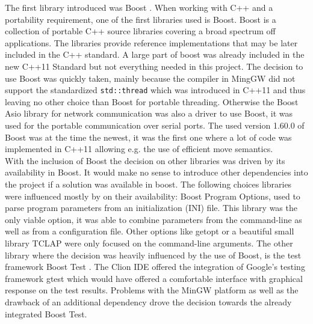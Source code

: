 The first library introduced was Boost \cite{boost}. When working with C++ and a portability requirement, one of the first libraries used is Boost. Boost is a collection of portable C++ source libraries covering a broad spectrum off applications. The libraries provide reference implementations that may be later included in the C++ standard. A large part of boost was already included in the new C++11 Standard \cite{cpp_11} but not everything needed in this project. The decision to use Boost was quickly taken, mainly because the compiler in MingGW \cite{mingw} did not support the standardized \texttt{std::thread} which was introduced in C++11 and thus leaving no other choice than Boost for portable threading. Otherwise the Boost Asio library \cite{boost_asio} for network communication was also a driver to use Boost, it was used for the portable communication over serial ports. The used version 1.60.0 of Boost was at the time the newest, it was the first one where a lot of code was implemented in C++11 allowing e.g. the use of efficient move semantics.\\
With the inclusion of Boost the decision on other libraries was driven by its availability in Boost. It would make no sense to introduce other dependencies into the project if a solution was available in boost. The following choices libraries were influenced mostly by on their availability: Boost Program Options, used to parse program parameters from an initialization (INI) file. This library was the only viable option, it was able to combine parameters from the command-line as well as from a configuration file. Other options like getopt \cite{getop} or a beautiful small library TCLAP \cite{tclap} were only focused on the command-line arguments. The other library where the decision was heavily influenced by the use of Boost, is the test framework Boost Test \cite{boost_test}. The Clion IDE offered the integration of Google's testing framework gtest \cite{gtest} which would have offered a comfortable interface with graphical response on the test results. Problems with the MinGW platform as well as the drawback of an additional dependency drove the decision towards the already integrated Boost Test.


